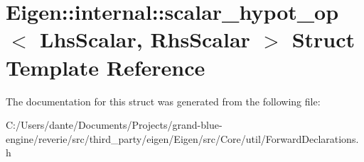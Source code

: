\hypertarget{struct_eigen_1_1internal_1_1scalar__hypot__op}{}\section{Eigen\+::internal\+::scalar\+\_\+hypot\+\_\+op$<$ Lhs\+Scalar, Rhs\+Scalar $>$ Struct Template Reference}
\label{struct_eigen_1_1internal_1_1scalar__hypot__op}


The documentation for this struct was generated from the following file\+:\begin{DoxyCompactItemize}
\item 
C\+:/\+Users/dante/\+Documents/\+Projects/grand-\/blue-\/engine/reverie/src/third\+\_\+party/eigen/\+Eigen/src/\+Core/util/Forward\+Declarations.\+h\end{DoxyCompactItemize}
